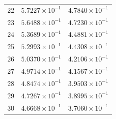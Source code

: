 \begin{table}[H]
\begin{tabular}{@{}rrr@{}}
22 & $5.7227\times10^{-1}$ & $4.7840\times10^{-1}$\\
23 & $5.6488\times10^{-1}$ & $4.7230\times10^{-1}$\\
24 & $5.3689\times10^{-1}$ & $4.4881\times10^{-1}$\\
25 & $5.2993\times10^{-1}$ & $4.4308\times10^{-1}$\\
26 & $5.0370\times10^{-1}$ & $4.2106\times10^{-1}$\\
27 & $4.9714\times10^{-1}$ & $4.1567\times10^{-1}$\\
28 & $4.8474\times10^{-1}$ & $3.9503\times10^{-1}$\\
29 & $4.7267\times10^{-1}$ & $3.8995\times10^{-1}$\\
30 & $4.6668\times10^{-1}$ & $3.7060\times10^{-1}$\\
\bottomrule
\end{tabular}
\end{table}

